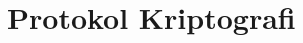 \documentclass[../main.tex]{subfiles}
\begin{document}
\chapter{Protokol Kriptografi}
\end{document}
